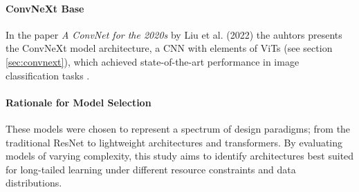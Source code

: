 




\paragraph{ConvNeXt Base}
In the paper \emph{A ConvNet for the 2020s} by Liu et al. (2022) \cite{liu2022convnet2020s} the auhtors presents the ConvNeXt model architecture, a CNN with elements of ViTs (see section \ref{sec:convnext}), which achieved state-of-the-art performance in image classification tasks . 

    
\paragraph{Rationale for Model Selection}
These models were chosen to represent a spectrum of design paradigms; from the traditional ResNet to lightweight architectures and transformers. By evaluating models of varying complexity, this study aims to identify architectures best suited for long-tailed learning under different resource constraints and data distributions.

